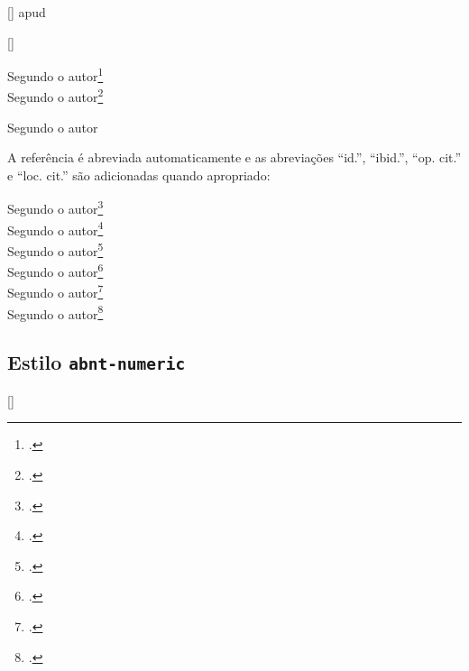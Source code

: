 \documentclass[a4paper]{article}
\begin{document}
\makeatletter
\DeclareCiteCommand{\@apud}[\mkbibfootnote]%
	{%
		{}%
		{%
		\addspace\bibstring{apud}\addspace}}%
	{%
	}%
	{\setunit{\multicitedelim}}%
	{}%

\DeclareMultiCiteCommand{\apud}[\addapud\mkbibfootnote]%
	{\@apud}%
	{\setunit{\multicitedelim}%
}%
\makeatother

\begin{example}
Segundo o autor\footcite{bosi08}\\
Segundo o autor\footcite{assis08:1}
\end{example}

\begin{example}
Segundo o autor
\end{example}

A referência é abreviada automaticamente e as abreviações ``id.'',
``ibid.'', ``op. cit.'' e ``loc. cit.'' são adicionadas quando apropriado:

\begin{example}
Segundo o autor\footcite[25]{assis08}\\
Segundo o autor\footcite[55]{assis08:1}\\
Segundo o autor\footcite[43]{bosi08}\\
Segundo o autor\footcite[134]{bosi08}\\
Segundo o autor\footcite[25]{assis08}\\
Segundo o autor\footcite[254]{bosi08}
\end{example}%

\subsection{Estilo \texttt{abnt-numeric}}%

\DeclareCiteCommand{\supercite}[\mkbibsuperscript]
  {
     {}
     {}%
     {}
     {}}
  {%
   }
  {\supercitedelim}
  {}


\end{document}
